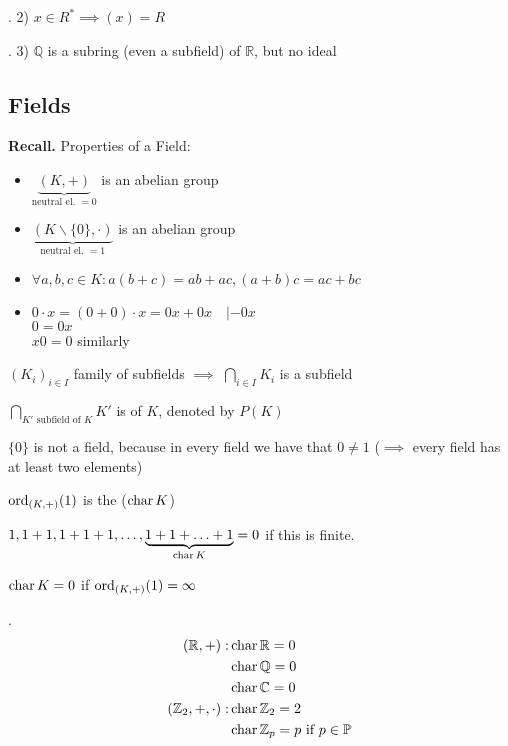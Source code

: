 \Example.
2) $x\in R^{*} \implies (x) = R$

\Example.
3) $\mathbb{Q}$ is a subring (even a subfield) of $\mathbb{R}$, but no ideal

\subsection{Fields}

\textbf{Recall.} Properties of a Field:
\begin{itemize}
  \item $\underbrace{(K,+)}_{\text{neutral el. }= 0}$ is an abelian group

  \item  $\underbrace{(K\backslash \{0\}, \cdot)}_{\text{neutral el. }= 1}$ is an abelian group

  \item $\forall a,b,c \in K: a(b+c) = ab+ac, (a+b)c = ac+bc$

  \item $0\cdot x = (0+0) \cdot x = 0x + 0x \quad | -0x$\\
        $0 = 0x$\\
        $x0 = 0$ similarly
\end{itemize}

$(K_i)_{i\in I}$ family of subfields $\implies$ $\bigcap_{i\in I} K_i$ is a subfield

\begin{definition}
  $\displaystyle{\bigcap_{K' \text{ subfield of $K$}} K'}$ is  of $K$, denoted by $P(K)$
\end{definition}

$\{0\}$ is not a field, because in every field we have that $0 \neq 1$ ($\implies$ every field has at least two elements)

\begin{definition}
  $\operatorname{ord}_{(K,+)} (1)$ is the  ($\operatorname{char} K$)
\end{definition}

$1,1+1, 1+1+1, \ldots, \underbrace{1+1+ \ldots +1}_{\operatorname{char} K} = 0$ if this is finite.

$\operatorname{char} K = 0$ if $\operatorname{ord}_{(K,+)} (1) = \infty$

\Example.
\begin{align*}
  (\mathbb{R}, +): &\operatorname{char} \mathbb{R} = 0\\
  &\operatorname{char} \mathbb{Q} = 0\\
  &\operatorname{char} \mathbb{C} = 0\\
  (\mathbb{Z}_2, +, \cdot): &\operatorname{char} \mathbb{Z}_2 = 2\\
  &\operatorname{char} \mathbb{Z}_p = p \text{ if } p \in \mathbb{P}
\end{align*}

